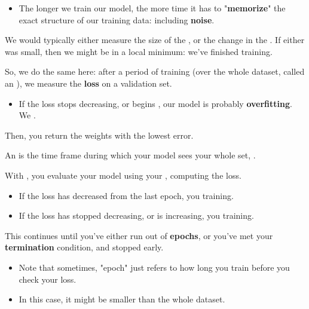             \begin{itemize}
                \item The longer we train our model, the more time it has to "\textbf{memorize}" the exact structure of our training data: including \textbf{noise}.
            \end{itemize}

            We would typically either measure the size of the , or the change in the . If either was small, then we might be in a local minimum: we've finished training.

            \subsecdiv

            So, we do the same here: after a period of training (over the whole dataset, called an ), we measure the \textbf{loss} on a validation set.

            \begin{itemize}
                \item If the loss stops decreasing, or begins , our model is probably \textbf{overfitting}. We .
            \end{itemize}

            Then, you return the weights with the lowest error.\\

            \begin{definition}
                An  is the time frame during which your model sees your whole  set, .

                \subsecdiv

                With , you evaluate your model using your , computing the loss.

                \begin{itemize}
                    \item If the loss has decreased from the last epoch, you  training.
                    \item If the loss has stopped decreasing, or is increasing, you  training.
                \end{itemize}

                This continues until you've either run out of \textbf{epochs}, or you've met your \textbf{termination} condition, and stopped early.

                \subsecdiv

                \begin{itemize}
                    \item Note that sometimes, "epoch" just refers to how long you train before you check your loss.
                    \item In this case, it might be smaller than the whole dataset.
                \end{itemize}
            \end{definition}


